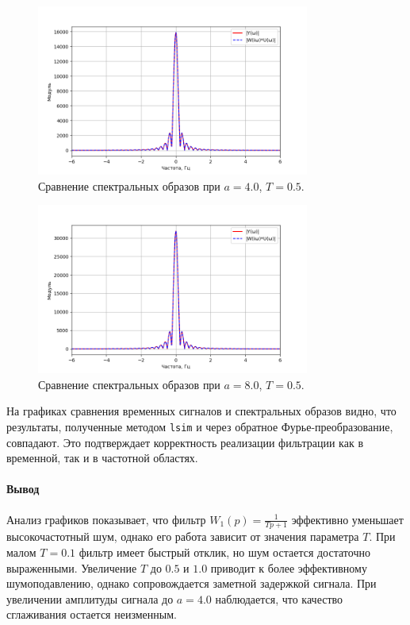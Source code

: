 \documentclass[a4paper]{article}
\begin{document}
\begin{figure}[H]
  \centering
  \includegraphics[width=0.8\textwidth]{src/task_1_1/spec_comp_4.0_0.5.png}
  \caption{Сравнение спектральных образов при $a = 4.0$, $T = 0.5$.}
\end{figure}

\begin{figure}[H]
  \centering
  \includegraphics[width=0.8\textwidth]{src/task_1_1/spec_comp_8.0_0.5.png}
  \caption{Сравнение спектральных образов при \(a=8.0\), \(T=0.5\).}
\end{figure}

\noindent На графиках сравнения временных сигналов и спектральных образов видно, что результаты, полученные методом \texttt{lsim} и через обратное Фурье-преобразование, совпадают. Это подтверждает корректность реализации фильтрации как в временной, так и в частотной областях. 

\paragraph{Вывод}
Анализ графиков показывает, что фильтр \(W_1(p)=\frac{1}{Tp+1}\) эффективно уменьшает высокочастотный шум, однако его работа зависит от значения параметра \(T\). При малом \(T=0.1\) фильтр имеет быстрый отклик, но шум остается достаточно выраженными. Увеличение \(T\) до \(0.5\) и \(1.0\) приводит к более эффективному шумоподавлению, однако сопровождается заметной задержкой сигнала. При увеличении амплитуды сигнала до \(a=4.0\) наблюдается, что качество сглаживания остается неизменным. 
\end{document}
